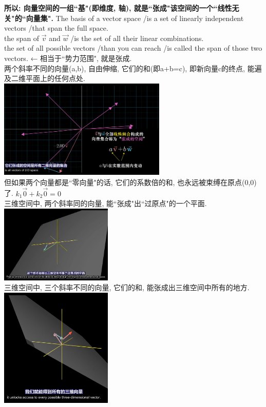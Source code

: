 \documentclass[UTF8]{ctexart}
\begin{document}
\textbf{所以: 向量空间的一组``基"(即维度, 轴), 就是``张成"该空间的一个``线性无关"的``向量集".} The basis of a vector space /is a set of linearly independent vectors /that span the full space. \\





the span of $\vec{v}$ and $\vec{w} $  /is the set of  all their linear combinations.\\
the set of all possible vectors /than you can reach /is called the span of those two vectors. ← 相当于``势力范围", 就是张成.\\


两个斜率不同的向量(a,b), 自由伸缩, 它们的和(即a+b=c), 即新向量c的终点, 能遍及二维平面上的任何点处.\\

\includegraphics[width=0.6\textwidth]{img/0070.png}\\

但如果两个向量都是``零向量"的话, 它们的系数倍的和, 也永远被束缚在原点(0,0)了. $ k_1 \vec{0}  +  k_2 \vec{0}=0$ \\

三维空间中, 两个斜率同的向量, 能``张成"出``过原点"的一个平面.\\
\includegraphics[width=0.4\textwidth]{img/0071.png}\\

三维空间中, 三个斜率不同的向量, 它们的和, 能张成出三维空间中所有的地方. \\
\includegraphics[width=0.4\textwidth]{img/0072.png}\\
\end{document}
